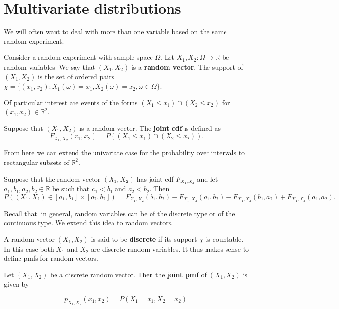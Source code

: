 \section{Multivariate distributions}

We will often want to deal with more than one variable based on the same random experiment.

\begin{definition}
	Consider a random experiment with sample space $\Omega$. Let $X_1,X_2:\Omega\to\mathbb R$ be random variables. We say that $(X_1,X_2)$ is a \textbf{random vector}. The support of $(X_1,X_2)$ is the set of ordered pairs $\chi=\{(x_1,x_2):X_1(\omega)=x_1,X_2(\omega)=x_2,\omega\in \Omega\}$.
\end{definition}

Of particular interest are events of the forms $(X_1\leq x_1)\cap(X_2\leq x_2)$ for $(x_1,x_2)\in\mathbb R^2$.

\begin{definition}
	Suppose that $(X_1,X_2)$ is a random vector. The \textbf{joint cdf} is defined as $$F_{X_1,X_2}(x_1,x_2)=P((X_1\leq x_1)\cap(X_2\leq x_2)).$$
\end{definition}

From here we can extend the univariate case for the probability over intervals to rectangular subsets of $\mathbb R^2$.

\begin{theorem}[]
	Suppose that the random vector $(X_1,X_2)$ has joint cdf $F_{X_1,X_2}$ and let $a_1,b_1,a_2,b_2\in\mathbb R$ be such that $a_1<b_1$ and $a_2<b_2$. Then $$P((X_1,X_2)\in[a_1,b_1]\times[a_2,b_2])=F_{X_1,X_2}(b_1,b_2)-F_{X_1,X_2}(a_1,b_2)-F_{X_1,X_2}(b_1,a_2)+F_{X_1,X_2}(a_1,a_2).$$
\end{theorem}

Recall that, in general, random variables can be of the discrete type or of the continuous type. We extend this idea to random vectors.

A random vector $(X_1,X_2)$ is said to be \textbf{discrete} if its support $\chi$ is countable. In this case both $X_1$ and $X_2$ are discrete random variables. It thus makes sense to define pmfs for random vectors.

\begin{definition}
	Let $(X_1,X_2)$ be a discrete random vector. Then the \textbf{joint pmf} of $(X_1,X_2)$ is given by

	$$p_{X_1,X_2}(x_1,x_2)=P(X_1=x_1,X_2=x_2).$$
\end{definition}

